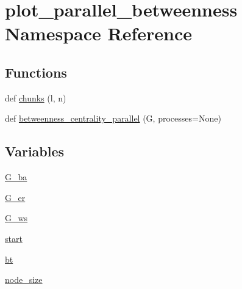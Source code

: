 \hypertarget{namespaceplot__parallel__betweenness}{}\section{plot\+\_\+parallel\+\_\+betweenness Namespace Reference}
\label{namespaceplot__parallel__betweenness}
\subsection*{Functions}
\begin{DoxyCompactItemize}
\item 
def \hyperlink{namespaceplot__parallel__betweenness_a12a74e041def2d649403c69d0fe0345b}{chunks} (l, n)
\item 
def \hyperlink{namespaceplot__parallel__betweenness_a12f186c06f1573546f40373301f884d4}{betweenness\+\_\+centrality\+\_\+parallel} (G, processes=None)
\end{DoxyCompactItemize}
\subsection*{Variables}
\begin{DoxyCompactItemize}
\item 
\hyperlink{namespaceplot__parallel__betweenness_ae72acd07b6fdbd677b133ab23c70a221}{G\+\_\+ba}
\item 
\hyperlink{namespaceplot__parallel__betweenness_a9731ff361a8c9ed5b91730c092e39cff}{G\+\_\+er}
\item 
\hyperlink{namespaceplot__parallel__betweenness_a482003f6c1ab419fa7e1a012131a109f}{G\+\_\+ws}
\item 
\hyperlink{namespaceplot__parallel__betweenness_a2ad5c57ac685472a48912b89fc7fc0f0}{start}
\item 
\hyperlink{namespaceplot__parallel__betweenness_ab0de598d353ebbcd7b37f9d63d9e5e1b}{bt}
\item 
\hyperlink{namespaceplot__parallel__betweenness_ad6bb279dc486a0dc35e22633e9f4353d}{node\+\_\+size}
\end{DoxyCompactItemize}


